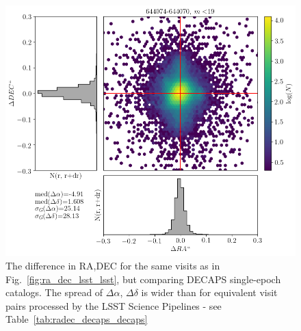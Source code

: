 \documentclass[DM,lsstdraft,toc,usenatbib]{lsstdoc}
\begin{document}
\begin{figure}
\begin{centering}
\includegraphics[width=0.8\columnwidth]{figs/decaps644074-644070_RA_DEC_offset_lims.png}
\caption{The difference in RA,DEC for  the same visits as in Fig.~\ref{fig:ra_dec_lsst_lsst}, but comparing DECAPS single-epoch catalogs. The spread of  $\Delta \alpha$, $\Delta \delta$ is wider than for equivalent visit pairs processed by the LSST Science Pipelines - see Table~\ref{tab:radec_decaps_decaps}}
\label{fig:ra_dec_decaps_decaps}
\end{centering}
\end{figure} 
\end{document}
